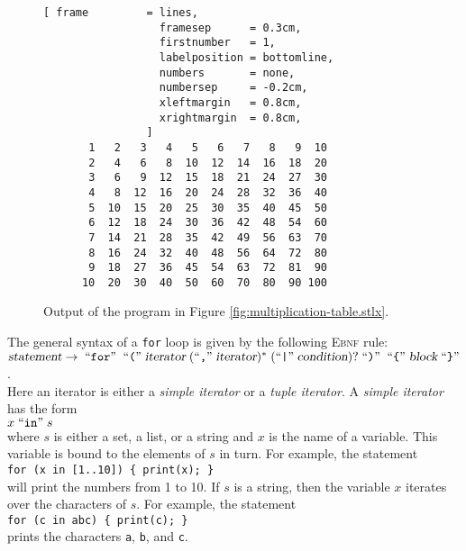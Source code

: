 \begin{figure}[!ht]
\centering
\begin{Verbatim}[ frame         = lines, 
                  framesep      = 0.3cm, 
                  firstnumber   = 1,
                  labelposition = bottomline,
                  numbers       = none,
                  numbersep     = -0.2cm,
                  xleftmargin   = 0.8cm,
                  xrightmargin  = 0.8cm,
                ]
       1   2   3   4   5   6   7   8   9  10
       2   4   6   8  10  12  14  16  18  20
       3   6   9  12  15  18  21  24  27  30
       4   8  12  16  20  24  28  32  36  40
       5  10  15  20  25  30  35  40  45  50
       6  12  18  24  30  36  42  48  54  60
       7  14  21  28  35  42  49  56  63  70
       8  16  24  32  40  48  56  64  72  80
       9  18  27  36  45  54  63  72  81  90
      10  20  30  40  50  60  70  80  90 100
\end{Verbatim}
\vspace*{-0.3cm}
\caption{Output of the program in Figure \ref{fig:multiplication-table.stlx}.}
\label{fig:multiplication-table}
\end{figure}

The general syntax of a \texttt{for} loop is given by the following \textsc{Ebnf} rule:
\\[0.2cm]
\hspace*{1.3cm}
$\textsl{statement} \rightarrow \;\mbox{``\texttt{for}''}\; \;\mbox{``\texttt{(}''}\; \textsl{iterator} \;(\mbox{``\texttt{,}''}\;
\textsl{iterator})^* \;(\mbox{``\texttt{|}''}\; \textsl{condition})? \;\mbox{``\texttt{)}''}\;
  \;\mbox{``\texttt{\{}''}\; \textsl{block} \;\mbox{``\texttt{\}}''}
$.
\\[0.2cm]
Here an iterator is either a \emph{simple iterator} or a \emph{tuple iterator}.  A
\emph{simple iterator} has the form
\\[0.2cm]
\hspace*{1.3cm}
$x \;\mbox{``\texttt{in}''}\; s$
\\[0.2cm]
where $s$ is either a set, a list, or a string and $x$ is the name of a variable.
This variable is bound to the elements of $s$ in turn.  For example,  the statement
\\[0.2cm]
\hspace*{1.3cm}
\texttt{for (x in [1..10]) \{ print(x); \}}
\\[0.2cm]
will print the numbers from 1 to 10.  If $s$ is a string, then the variable $x$ iterates over the
characters of $s$.  For example, the statement
\\[0.2cm]
\hspace*{1.3cm}
\texttt{for (c in abc) \{ print(c); \}}
\\[0.2cm]
prints the characters \texttt{a}, \texttt{b},
and \texttt{c}.  



